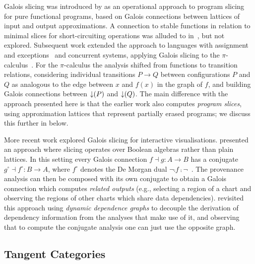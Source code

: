 Galois slicing was introduced by \citet{perera12a} as an operational approach to program slicing for pure
functional programs, based on Galois connections between lattices of input and output approximations. A
connection to stable functions in relation to minimal slices for short-circuiting operations was alluded to
in~\citet{perera13}, but not explored. Subsequent work extended the approach to languages with assignment and
exceptions~\cite{ricciotti17} and concurrent systems, applying Galois slicing to the
$\pi$-calculus~\cite{perera16d}. For the $\pi$-calculus the analysis shifted from functions to transition
relations, considering individual transitions $P \longrightarrow Q$ between configurations $P$ and $Q$ as
analogous to the edge between $x$ and $f(x)$ in the graph of $f$, and building Galois connections between
$\mathop{\downarrow}(P)$ and $\mathop{\downarrow}(Q)$. The main difference with the approach presented here is that the earlier work
also computes \emph{program slices}, using approximation lattices that represent partially erased programs; we
discuss this further in  below.

More recent work explored Galois slicing for interactive visualisations. \citet{perera22} presented an
approach where slicing operates over Boolean algebras rather than plain lattices. In this setting every Galois
connection $f \dashv g: A \to B$ has a conjugate $g^\circ \dashv f^\circ: B \to A$, where $f^\circ$ denotes
the De Morgan dual $\neg \comp f \comp \neg$~\cite{jonsson51}. The provenance analysis can then be composed
with its own conjugate to obtain a Galois connection which computes \emph{related outputs} (e.g., selecting a
region of a chart and observing the regions of other charts which share data dependencies). \citet{bond25}
revisited this approach using \emph{dynamic dependence graphs} to decouple the derivation of dependency
information from the analyses that make use of it, and observing that to compute the conjugate analysis one
can just use the opposite graph.

\subsection{Tangent Categories}

